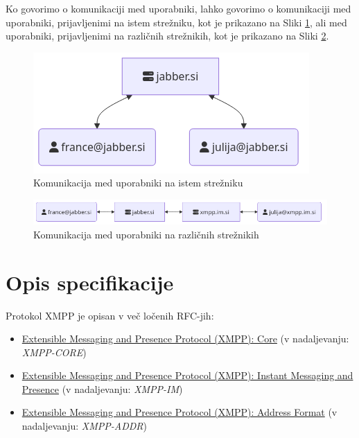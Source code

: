 \documentclass[11pt]{article}
\begin{document}
Ko govorimo o komunikaciji med uporabniki, lahko govorimo o
komunikaciji med uporabniki, prijavljenimi na istem strežniku, kot je
prikazano na Sliki \ref{fig:org228fbb5}, ali med uporabniki, prijavljenimi
na različnih strežnikih, kot je prikazano na Sliki \ref{fig:org52e02e3}.

\begin{figure}[H]
\centering
\includegraphics[width=.9\linewidth]{images/local-server.png}
\caption{\label{fig:org228fbb5}Komunikacija med uporabniki na istem strežniku}
\end{figure}

\begin{figure}[H]
\centering
\includegraphics[width=.9\linewidth]{images/cross-server.png}
\caption{\label{fig:org52e02e3}Komunikacija med uporabniki na različnih strežnikih}
\end{figure}

\section{Opis specifikacije}
\label{sec:orgf2f7830}

Protokol XMPP je opisan v več ločenih RFC-jih:

\begin{itemize}
\item \href{https://datatracker.ietf.org/doc/rfc6120/}{Extensible Messaging and Presence Protocol (XMPP): Core} (v
nadaljevanju: \emph{XMPP-CORE})
\item \href{https://datatracker.ietf.org/doc/rfc6121/}{Extensible Messaging
and Presence Protocol (XMPP): Instant Messaging and Presence} (v
nadaljevanju: \emph{XMPP-IM})
\item \href{https://datatracker.ietf.org/doc/rfc7622/}{Extensible Messaging and Presence Protocol (XMPP): Address Format} (v
nadaljevanju: \emph{XMPP-ADDR})
\end{itemize}
\end{document}
